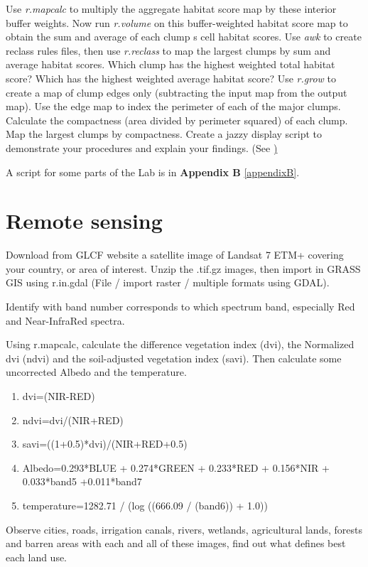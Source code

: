 Use \textit{r.mapcalc} to multiply the aggregate habitat score map by these interior buffer weights.
Now run \textit{r.volume }on this buffer-weighted habitat score map to obtain the sum and average of each clump s cell habitat scores.
Use \textit{awk} to create reclass rules files, then use \textit{r.reclass} to map the largest clumps by sum and average habitat scores.
Which clump has the highest weighted total habitat score? Which has the highest weighted average habitat score?
Use \textit{r.grow} to create a map of clump edges only (subtracting the input map from the output map).
Use the edge map to index the perimeter of each of the major clumps. 
Calculate the compactness (area divided by perimeter squared) of each clump. 
Map the largest clumps by compactness. Create a jazzy display script to demonstrate your procedures and explain your findings.
(See \href{http://www.udel.edu/johnmack/frec682/script_ideas.html})

A script for some parts of the Lab is in \textbf{Appendix B} \ref{appendixB}.

\newpage
\section{Remote sensing}
\label{remote_sensing}

Download from GLCF website a satellite image of Landsat 7 ETM+ covering your country, or area of interest.
Unzip the .tif.gz images, then import in GRASS GIS using r.in.gdal (File / import raster / multiple formats using GDAL).

Identify with band number corresponds to which spectrum band, especially Red and Near-InfraRed spectra.

Using r.mapcalc, calculate the difference vegetation index (dvi), the Normalized dvi (ndvi) and the soil-adjusted vegetation index (savi). Then calculate some uncorrected Albedo and the temperature.

\begin{enumerate}
 \item dvi=(NIR-RED)
 \item ndvi=dvi/(NIR+RED)
 \item savi=((1+0.5)*dvi)/(NIR+RED+0.5)
 \item Albedo=0.293*BLUE + 0.274*GREEN + 0.233*RED + 0.156*NIR + 0.033*band5 +0.011*band7
 \item temperature=1282.71 / (log ((666.09 / (band6)) + 1.0))
\end{enumerate}

Observe cities, roads, irrigation canals, rivers, wetlands, agricultural lands, forests and barren areas with each and all of these images, find out what defines best each land use.

